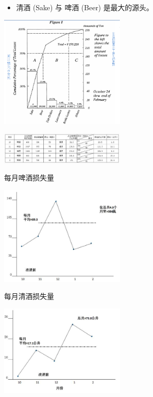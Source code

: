 \begin{itemize}
\tightlist
\item
  清酒 (Sake) 与 啤酒 (Beer) 是最大的源头。
\end{itemize}


\includegraphics[width=6cm]{club55.png}


\includegraphics[width=6cm]{club61.jpg}

每月啤酒损失量


\includegraphics[width=6cm]{club71.jpg}

每月清酒损失量


\includegraphics[width=6cm]{club72.jpg}

